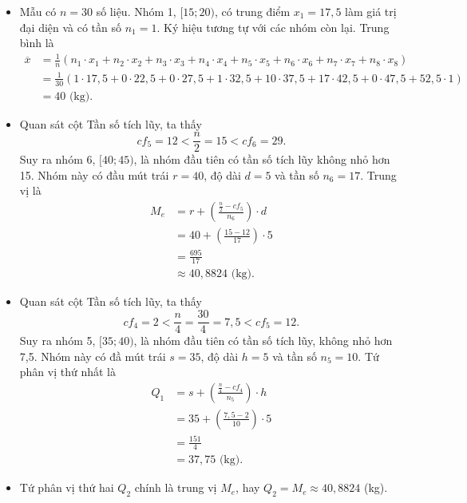\documentclass[
  letterpaper,
  DIV=11,
  numbers=noendperiod]{scrartcl}
\providecommand{\tightlist}{%
  \setlength{\itemsep}{0pt}\setlength{\parskip}{0pt}}\usepackage{longtable,booktabs,array}
\begin{document}
\begin{itemize}
\tightlist
\item
  Mẫu có \(n=30\) số liệu. Nhóm 1, \([15;20)\), có trung điểm
  \(x_1=17,5\) làm giá trị đại diện và có tần số \(n_1=1\). Ký hiệu
  tương tự với các nhóm còn lại. Trung bình là \begin{align*}
  \overline{x}
    & = \frac{1}{n}(n_1\cdot x_1 + n_2\cdot x_2 + n_3\cdot x_3 + n_4\cdot x_4 + n_5\cdot x_5 + n_6\cdot x_6 + n_7\cdot x_7 + n_8\cdot x_8) \\
    & = \frac{1}{30} (1\cdot 17,5 + 0\cdot 22,5 + 0\cdot 27,5+ 1\cdot 32,5 + 10\cdot 37,5 + 17\cdot 42,5 + 0\cdot 47,5 + 52,5 \cdot 1) \\
    & = 40 \text{ (kg).}
  \end{align*}
\end{itemize}

\begin{itemize}
\tightlist
\item
  Quan sát cột Tần số tích lũy, ta thấy \[
  cf_5=12 < \frac{n}{2}=15 < cf_6=29.
  \] Suy ra nhóm 6, \([40;45)\), là nhóm đầu tiên có tần số tích lũy
  không nhỏ hơn 15. Nhóm này có đầu mút trái \(r=40\), độ dài \(d=5\) và
  tần số \(n_6=17\). Trung vị là \begin{align*}
  M_e
    & = r + \left(\frac{\frac{n}{2}-cf_5}{n_6}\right)\cdot d \\
    & = 40 + \left(\frac{15-12}{17}\right)\cdot 5 \\
    & = \frac{695}{17} \\
    & \approx 40,8824 \text{ (kg).}
  \end{align*}
\end{itemize}

\begin{itemize}
\item
  Quan sát cột Tần số tích lũy, ta thấy \[
  cf_4=2 <\frac{n}{4}=\frac{30}{4}=7,5 < cf_5=12.
  \] Suy ra nhóm 5, \([35;40)\), là nhóm đầu tiên có tần số tích lũy,
  không nhỏ hơn 7,5. Nhóm này có đầ mút trái \(s=35\), độ dài \(h=5\) và
  tần số \(n_5=10\). Tứ phân vị thứ nhất là \begin{align*}
        Q_1
            & = s + \left( \frac{\frac{n}{4}-cf_4}{n_5}\right)\cdot h \\
            & = 35 + \left(\frac{7,5-2}{10}\right)\cdot 5 \\
            & = \frac{151}{4} \\
            & = 37,75 \text{ (kg).}
    \end{align*}
\item
  Tứ phân vị thứ hai \(Q_2\) chính là trung vị \(M_e\), hay
  \(Q_2=M_e \approx 40,8824\) (kg).
\end{itemize}
\end{document}
